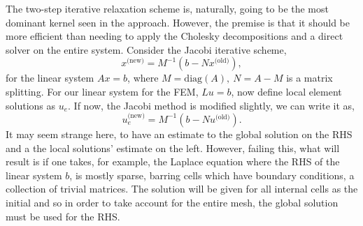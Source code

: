 The two-step iterative relaxation scheme is, naturally, going to be the most dominant kernel seen in the approach. However, the premise is that it should be more efficient than needing to apply the Cholesky decompositions and a direct solver on the entire system. Consider the Jacobi iterative scheme,
\begin{equation}
	x^{\text{(new)}} = M^{-1}(b - N x^{\text{(old)}}),
\end{equation}
for the linear system $Ax=b$, where $M = \text{diag}(A),~N=A-M$ is a matrix splitting. For our linear system for the FEM, $Lu = b$, now define local element solutions as $u_e$. If now, the Jacobi method is modified slightly, we can write it as,
\begin{equation}\label{jacobi}
	u^{\text{(new)}}_e = M^{-1}(b - N u^{\text{(old)}}).
\end{equation}
It may seem strange here, to have an estimate to the global solution on the RHS and a the local solutions' estimate on the left. However, failing this, what will result is  if one takes, for example, the Laplace equation where the RHS of the linear system $b$, is mostly sparse, barring cells which have boundary conditions, a collection of trivial matrices. The solution will be given for all internal cells as the initial and so in order to take account for the entire mesh, the global solution must be used for the RHS.

